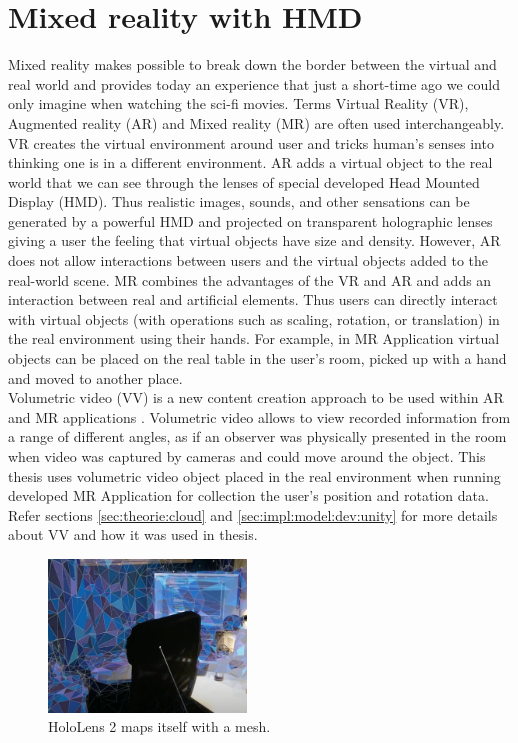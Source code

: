 \section{Mixed reality with HMD}
\label{sec:theorie:ar}
Mixed reality makes possible to break down the border between the virtual and real world and provides today an experience that just a short-time ago we could only imagine when watching the sci-fi movies. Terms Virtual Reality (VR), Augmented reality (AR) and Mixed reality (MR) are often used interchangeably. VR creates the virtual environment around user and tricks human's senses into thinking one is in a different environment. AR adds a virtual object to the real world that we can see through the lenses of special developed Head Mounted Display (HMD). Thus realistic images, sounds, and other sensations can be generated by a powerful HMD and projected on transparent holographic lenses giving a user the feeling that virtual objects have size and density. However, AR does not allow interactions between users and the virtual objects added to the real-world scene. MR combines the advantages of the VR and AR and adds an interaction between real and artificial elements. Thus users can directly interact with virtual objects (with operations such as scaling, rotation, or translation) in the real environment using their hands. For example, in MR Application virtual objects can be placed on the real table in the user's room, picked up with a hand and moved to another place.\\
Volumetric video (VV) is a new content creation approach to be used within AR and MR applications \cite{user_behav_volumetric}. Volumetric video allows to view recorded information from a range of different angles, as if an observer was physically presented in the room when video was captured by cameras and could move around the object. This thesis uses volumetric video object placed in the real environment when running developed MR Application for collection the user's position and rotation data. Refer sections \ref{sec:theorie:cloud} and \ref{sec:impl:model:dev:unity} for more details about VV and how it was used in thesis. 
\begin{figure}
	\centering
	\includegraphics[width=0.47\textwidth]{gfx/hololens_env.png}
	\caption{\label{fig:holo2_env}HoloLens 2 maps itself with a mesh.}
\end{figure}

